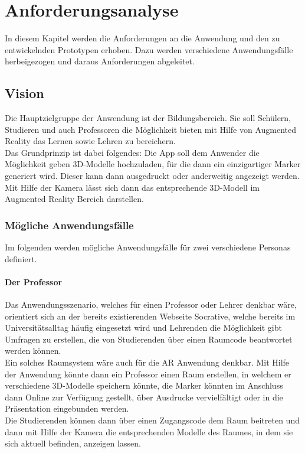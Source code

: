 \chapter{Anforderungsanalyse}\label{chapter:Anforderungsanalyse}
In diesem Kapitel werden die Anforderungen an die Anwendung und den zu entwickelnden Prototypen erhoben. Dazu werden verschiedene Anwendungsfälle herbeigezogen und daraus Anforderungen abgeleitet.

\section{Vision}
Die Hauptzielgruppe der Anwendung ist der Bildungsbereich. Sie soll Schülern, Studieren und auch Professoren die Möglichkeit bieten mit Hilfe von Augmented Reality das Lernen sowie Lehren zu bereichern. \\
Das Grundprinzip ist dabei folgendes: Die App soll dem Anwender die Möglichkeit geben 3D-Modelle hochzuladen, für die dann ein einzigartiger Marker generiert wird. Dieser kann dann ausgedruckt oder anderweitig angezeigt werden. Mit Hilfe der Kamera lässt sich dann das entsprechende 3D-Modell im Augmented Reality Bereich darstellen.

\subsection{Mögliche Anwendungsfälle}
Im folgenden werden mögliche Anwendungsfälle für zwei verschiedene Personas definiert.

\subsubsection{Der Professor}
Das Anwendungsszenario, welches für einen Professor oder Lehrer denkbar wäre, orientiert sich an der bereits existierenden Webseite Socrative, welche bereits im Universitätsalltag häufig eingesetzt wird und Lehrenden die Möglichkeit gibt Umfragen zu erstellen, die von Studierenden über einen Raumcode beantwortet werden können. \\
Ein solches Raumsystem wäre auch für die AR Anwendung denkbar.
Mit Hilfe der Anwendung könnte dann ein Professor einen Raum erstellen, in welchem er verschiedene 3D-Modelle speichern könnte, die Marker könnten im Anschluss dann Online zur Verfügung gestellt, über Ausdrucke vervielfältigt oder in die Präsentation eingebunden werden.\\
Die Studierenden können dann über einen Zugangscode dem Raum beitreten und dann mit Hilfe der Kamera die  entsprechenden Modelle des Raumes, in dem sie sich aktuell befinden, anzeigen lassen.

